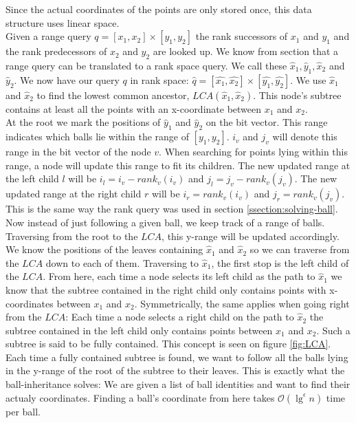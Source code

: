 Since the actual coordinates of the points are only stored once, this data structure uses linear space. \\

Given a range query $q = [x_1, x_2] \times [y_1, y_2]$ the rank successors of $x_1$ and $y_1$ and the rank predecessors of $x_2$ and $y_2$ are looked up. We know from section  that a range query can be translated to a rank space query. We call these $\hat{x}_1, \hat{y}_1, \hat{x}_2$ and $\hat{y}_2$. We now have our query $q$ in rank space: $\hat{q} = [\hat{x_1}, \hat{x_2}] \times [\hat{y_1}, \hat{y_2}]$. We use $\hat{x}_1$ and $\hat{x}_2$ to find the lowest common ancestor, $LCA(\hat{x}_1, \hat{x}_2)$. This node's subtree contains at least all the points with an x-coordinate between $x_1$ and $x_2$. \\

At the root we mark the positions of $\hat{y}_1$ and $\hat{y}_2$ on the bit vector. This range indicates which balls lie within the range of $[y_1, y_2]$. $i_v$ and $j_v$ will denote this range in the bit vector of the node $v$. When searching for points lying within this range, a node will update this range to fit its children. The new updated range at the left child $l$ will be $i_l = i_v - rank_v(i_v)$ and $j_l = j_v - rank_v(j_v)$. The new updated range at the right child $r$ will be $i_r = rank_v(i_v)$ and $j_r = rank_v(j_v)$. This is the same way the rank query was used in section \ref{ssection:solving-ball}. Now instead of just following a given ball, we keep track of a range of balls. \\

Traversing from the root to the $LCA$, this y-range will be updated accordingly. We know the positions of the leaves containing $\hat{x}_1$ and $\hat{x}_2$ so we can traverse from the $LCA$ down to each of them. Traversing to $\hat{x}_1$, the first stop is the left child of the $LCA$. From here, each time a node selects its left child as the path to $\hat{x}_1$ we know that the subtree contained in the right child only contains points with x-coordinates between $x_1$ and $x_2$. Symmetrically, the same applies when going right from the $LCA$: Each time a node selects a right child on the path to $\hat{x}_2$ the subtree contained in the left child only contains points between $x_1$ and $x_2$. Such a subtree is said to be fully contained. This concept is seen on figure \ref{fig:LCA}. \\

Each time a fully contained subtree is found, we want to follow all the balls lying in the y-range of the root of the subtree to their leaves. This is exactly what the ball-inheritance solves: We are given a list of ball identities and want to find their actualy coordinates. Finding a ball's coordinate from here takes $\mathcal{O}(\lg^\epsilon n)$ time per ball.

